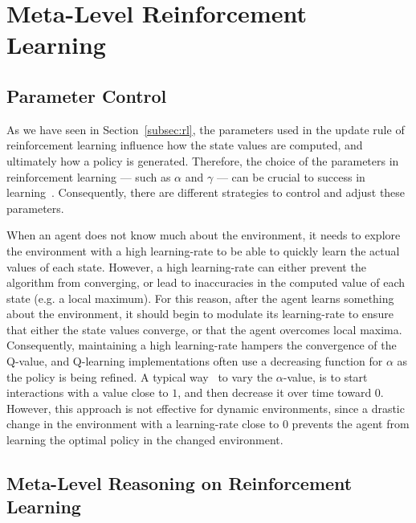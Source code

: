 \section{Meta-Level Reinforcement Learning}
\label{sec:meta-rl}



\subsection{Parameter Control}
\label{subsec:parameter-control}

As we have seen in Section~\ref{subsec:rl}, the parameters used in the update rule of reinforcement learning influence how the state values are computed, and ultimately how a policy is generated. 
Therefore, the choice of the parameters in reinforcement learning
--- such as $\alpha$ and $\gamma$ ---
can be crucial to success in learning~\cite{schweighofer2003meta}. 
Consequently, there are different strategies to control and adjust these parameters. 

When an agent does not know much about the environment, it needs to explore the environment with a high learning-rate to be able to quickly learn the actual values of each state. 
However, a high learning-rate can either prevent the algorithm from converging, or lead to inaccuracies in the computed value of each state (e.g. a local maximum). 
For this reason, after the agent learns something about the environment, it should begin to modulate its learning-rate to ensure that either the state values converge, or that the agent overcomes local maxima. 
% 
Consequently, maintaining a high learning-rate hampers the convergence of the Q-value, and Q-learning implementations often use a decreasing function for $\alpha$ as the policy is being refined. 
A typical way~\cite{schweighofer2003meta} to vary the $\alpha$-value, is to start interactions with a value close to $1$, and then decrease it over time toward $0$.
However, this approach is not effective for dynamic environments, since a drastic change in the environment with a learning-rate close to $0$ prevents the agent from learning the optimal policy in the changed environment. 



\subsection{Meta-Level Reasoning on Reinforcement Learning}
\label{subsec:meta-reasoning-rl}


